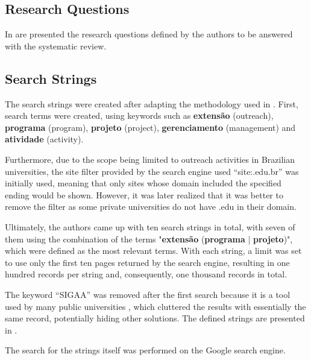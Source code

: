 

\subsection{Research Questions}\label{sec:gl-planning-rq}

In  are presented the research questions defined by the authors to be answered with the systematic review.



\subsection{Search Strings}\label{sec:gl-planning-strings}

The search strings were created after adapting the methodology used in \cite{godin2015applying}. First, search terms were created, using keywords such as \textbf{extensão} (outreach), \textbf{programa} (program), \textbf{projeto} (project), \textbf{gerenciamento} (management) and \textbf{atividade} (activity).

Furthermore, due to the scope being limited to outreach activities in Brazilian universities, the site filter provided by the search engine used ``site:.edu.br'' was initially used, meaning that only sites whose domain included the specified ending would be shown. However, it was later realized that it was better to remove the filter as some private universities do not have .edu in their domain.

Ultimately, the authors came up with ten search strings in total, with seven of them using the combination of the terms "\textbf{extensão} (\textbf{programa} | \textbf{projeto})", which were defined as the most relevant terms. With each string, a limit was set to use only the first ten pages returned by the search engine, resulting in one hundred records per string and, consequently, one thousand records in total.

The keyword ``\acs{SIGAA}'' was removed after the first search because it is a tool used by many public universities , which cluttered the results with essentially the same record, potentially hiding other solutions. The defined strings are presented in .



The search for the strings itself was performed on the Google search engine.

